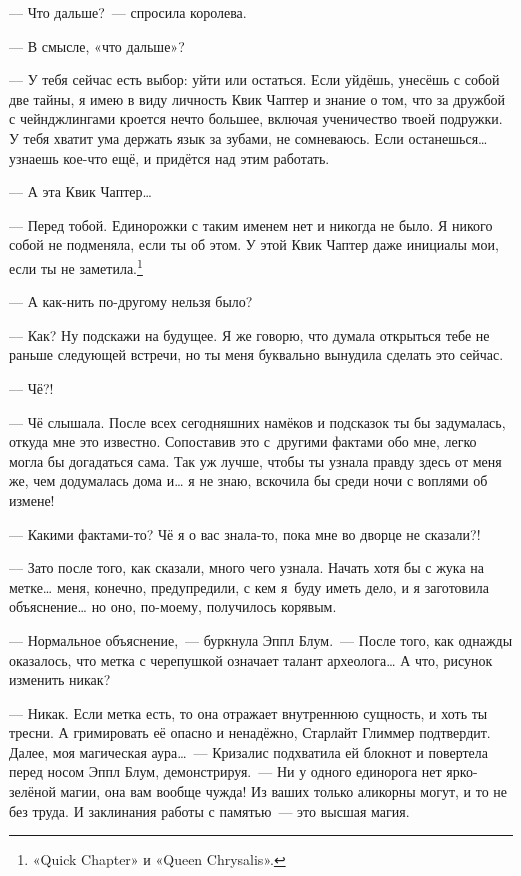 \documentclass[fontsize=11pt,a5paper,titlepage=firstcover]{scrbook}
\begin{document}
--- Что дальше?~--- спросила королева.

--- В смысле, «что дальше»?

--- У тебя сейчас есть выбор: уйти или остаться. Если уйдёшь, унесёшь с собой две тайны, я имею в виду личность Квик Чаптер и знание о том, что за дружбой с чейнджлингами кроется нечто большее, включая ученичество твоей подружки. У тебя хватит ума держать язык за зубами, не сомневаюсь. Если останешься{\ldots} узнаешь кое-что ещё, и придётся над этим работать.

--- А эта Квик Чаптер{\ldots}

--- Перед тобой. Единорожки с таким именем нет и никогда не было. Я никого собой не подменяла, если ты об этом. У этой Квик Чаптер даже инициалы мои, если ты не заметила.\footnote{«Quick Chapter» и «Queen Chrysalis».}

--- А как-нить по-другому нельзя было?

--- Как? Ну подскажи на будущее. Я же говорю, что думала открыться тебе не раньше следующей встречи, но ты меня буквально вынудила сделать это сейчас.

--- Чё?!

--- Чё слышала. После всех сегодняшних намёков и подсказок ты бы задумалась, откуда мне это известно. Сопоставив это с~другими фактами обо мне, легко могла бы догадаться сама. Так уж лучше, чтобы ты узнала правду здесь от меня же, чем додумалась дома и{\ldots} я не знаю, вскочила бы среди ночи с воплями об измене!

--- Какими фактами-то? Чё я о вас знала-то, пока мне во дворце не сказали?!

--- Зато после того, как сказали, много чего узнала. Начать хотя бы с жука на метке{\ldots} меня, конечно, предупредили, с кем я~буду иметь дело, и я заготовила объяснение{\ldots} но оно, по-моему, получилось корявым.

--- Нормальное объяснение,~--- буркнула Эппл Блум.~--- После того, как однажды оказалось, что метка с черепушкой означает талант археолога{\ldots} А что, рисунок изменить никак?

--- Никак. Если метка есть, то она отражает внутреннюю сущность, и хоть ты тресни. А гримировать её опасно и ненадёжно, Старлайт Глиммер подтвердит. Далее, моя магическая аура{\ldots}~--- Кризалис подхватила ей блокнот и повертела перед носом Эппл Блум, демонстрируя.~--- Ни у одного единорога нет ярко-зелёной магии, она вам вообще чужда! Из ваших только аликорны могут, и то не без труда. И заклинания работы с памятью~--- это высшая магия.
\end{document}
